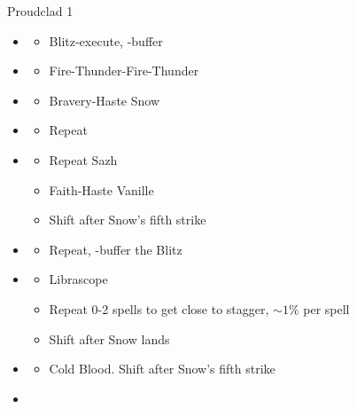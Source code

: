 \begin{multicols}{2}
\begin{battle}{Proudclad 1}
\begin{itemize}
    \item \second
    \begin{itemize}
        \item Blitz-execute, \rav-buffer
    \end{itemize}
    \item \sixth
    \begin{itemize}
        \item Fire-Thunder-Fire-Thunder
    \end{itemize}
    \item \fourth
    \begin{itemize}
        \item Bravery-Haste Snow
    \end{itemize}
    \item \sixth
    \begin{itemize}
        \item Repeat
    \end{itemize}
    \item \fourth
    \begin{itemize}
        \item Repeat Sazh
        \item Faith-Haste Vanille
        \item Shift after Snow's fifth strike
    \end{itemize}
    \item \first
    \begin{itemize}
        \item Repeat, \rav-buffer the Blitz
    \end{itemize}
    \item \fifth
    \begin{itemize}
        \item Librascope
        \item Repeat 0-2 spells to get close to stagger, $\sim1\%$ per spell
        \item Shift after Snow lands
    \end{itemize}
    \item \sixth
    \begin{itemize}
        \item Cold Blood. Shift after Snow's fifth strike
    \end{itemize}
    \item \fifth
    \begin{itemize}

\end{itemize}
\end{itemize}
\end{battle}
\end{multicols}
